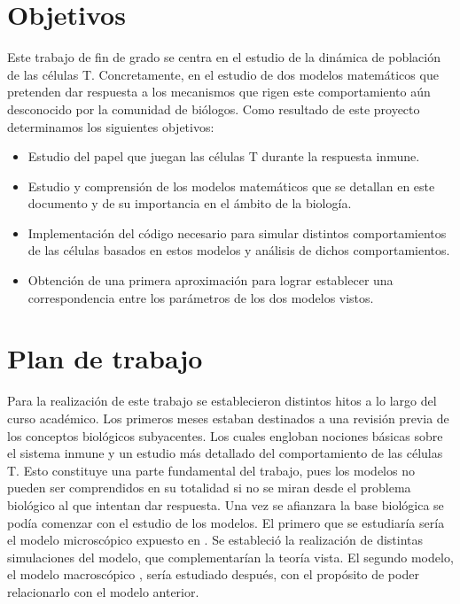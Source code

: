 \section{Objetivos}

Este trabajo de fin de grado se centra en el estudio de la dinámica de población de las células T. Concretamente, en el estudio de dos modelos matemáticos que pretenden dar respuesta a los mecanismos que rigen este comportamiento aún desconocido por la comunidad de biólogos. Como resultado de este proyecto determinamos los siguientes objetivos:

 \begin{itemize}

	\item Estudio del papel que juegan las células T durante la respuesta inmune.
	
	\item Estudio y comprensión de los modelos matemáticos que se detallan en este documento y de su importancia en el ámbito de la biología.
	
 	\item Implementación del código necesario para simular distintos comportamientos de las células basados en estos modelos y análisis de dichos comportamientos. 
 	
 	\item Obtención de una primera aproximación para lograr establecer una correspondencia entre los parámetros de los dos modelos vistos. 
 \end{itemize}


\section{Plan de trabajo}

Para la realización de este trabajo se establecieron distintos hitos a lo largo del curso académico. Los primeros meses estaban destinados a una revisión previa de los conceptos biológicos subyacentes. Los cuales engloban nociones básicas sobre el sistema inmune y un estudio más detallado del comportamiento de las células T. Esto constituye una parte fundamental del trabajo, pues los modelos no pueden ser comprendidos en su totalidad si no se miran desde el problema biológico al que intentan dar respuesta. Una vez se afianzara la base biológica se podía comenzar con el estudio de los modelos. El primero que se estudiaría sería el modelo microscópico expuesto en \cite{JTB}. Se estableció la realización de distintas simulaciones del modelo, que complementarían la teoría vista. El segundo modelo, el modelo macroscópico \citep{arias2015growth}, sería estudiado después, con el propósito de poder relacionarlo con el modelo anterior. 


